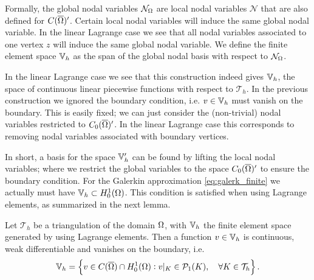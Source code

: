 \documentclass[thesis.tex]{subfiles}
\begin{document}
  Formally, the global nodal variables $\mathcal{N}_\Omega$ are local nodal variables $\mathcal{N}$ that are also defined for $C(\overline{\Omega})'$. Certain
  local nodal variables will induce the same global nodal variable. In the linear Lagrange case  we see that all nodal variables
  associated to one vertex $z$ will induce the same global nodal variable. We define the finite element space $\mathbb{V}_h$ as the span of the 
  global nodal basis with respect to $\mathcal{N}_\Omega$. 
  
  In the linear Lagrange case we see that this construction indeed gives $\mathbb{V}_h$, the space of continuous linear piecewise
  functions with respect to $\mathcal{T}_h$. In the previous construction we ignored
  the boundary condition, i.e.  $v \in \mathbb{V}_h$ must vanish on the boundary. This is easily fixed; we can just consider the (non-trivial)
  nodal variables restricted to $C_0(\overline{\Omega})'$. In the linear Lagrange case this corresponds to removing nodal variables associated with
  boundary vertices.  

  In short, a basis for the space $\mathbb{V}_h'$ can be found by lifting the local nodal variables; where we restrict
  the global variables to the space $C_0(\overline{\Omega})'$ to ensure the boundary condition.
  For the Galerkin approximation \eqref{eq:galerk_finite} we actually must have $\mathbb{V}_h \subset H^1_0(\Omega)$. This
  condition is satisfied when using Lagrange elements, as summarized in the next lemma.
  \begin{lem}
    \label{lem:lin_lagrange}
    Let $\mathcal{T}_h$ be a triangulation of the domain $\Omega$, with $\mathbb{V}_h$ the finite element space generated
    by using Lagrange elements. Then a function $v \in \mathbb{V}_h$ is continuous, weak differentiable and vanishes on the boundary, i.e.
    \[
      \mathbb{V}_h = \set{v \in C(\overline{\Omega}) \cap H_0^1(\Omega) : v|_{K} \in \mathcal{P}_1(K), \quad \forall K \in \mathcal{T}_h}.
    \]
  \end{lem}
\end{document}
